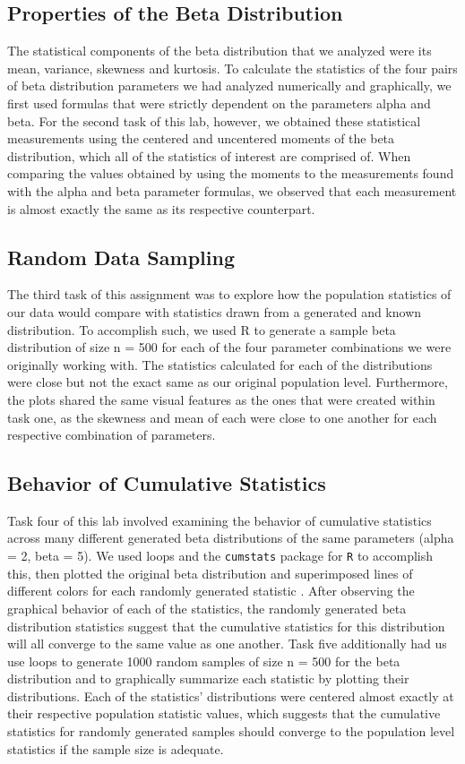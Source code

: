 \documentclass{article}\usepackage[]{graphicx}\usepackage[]{xcolor}
\begin{document}
\begin{multicols}{2}
\section{Properties of the Beta Distribution}
The statistical components of the beta distribution that we analyzed were its mean, variance, skewness and kurtosis. To calculate the statistics of the four pairs of beta distribution parameters we had analyzed numerically and graphically, we first used formulas that were strictly dependent on the parameters alpha and beta. For the second task of this lab, however, we obtained these statistical measurements using the centered and uncentered moments of the beta distribution, which all of the statistics of interest are comprised of. When comparing the values obtained by using the moments to the measurements found with the alpha and beta parameter formulas, we observed that each measurement is almost exactly the same as its respective counterpart. 

\subsection{Random Data Sampling}
The third task of this assignment was to explore how the population statistics of our data would compare with statistics drawn from a generated and known distribution. To accomplish such, we used R to generate a sample beta distribution of size n = 500 for each of the four parameter combinations we were originally working with. The statistics calculated for each of the distributions were close but not the exact same as our original population level. Furthermore, the plots shared the same visual features as the ones that were created within task one, as the skewness and mean of each were close to one another for each respective combination of parameters.

\subsection{Behavior of Cumulative Statistics}
Task four of this lab involved examining the behavior of cumulative statistics across many different generated beta distributions of the same parameters (alpha = 2, beta = 5). We used loops and the \texttt{cumstats} package for \texttt{R} to accomplish this, then plotted the original beta distribution and superimposed lines of different colors for each randomly generated statistic \citep{cumstats}. After observing the graphical behavior of each of the statistics, the randomly generated beta distribution statistics suggest that the cumulative statistics for this distribution will all converge to the same value as one another. Task five additionally had us use loops to generate 1000 random samples of size n = 500 for the beta distribution and to graphically summarize each statistic by plotting their distributions. Each of the statistics' distributions were centered almost exactly at their respective population statistic values, which suggests that the cumulative statistics for randomly generated samples should converge to the population level statistics if the sample size is adequate.


\end{multicols}
\end{document}
